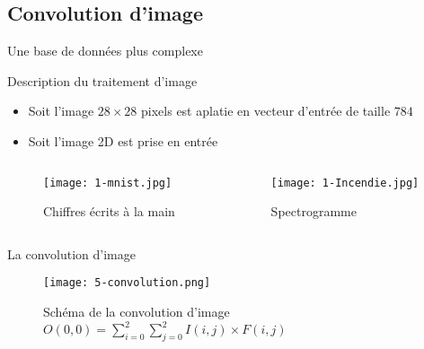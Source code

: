 \subsection{Convolution d'image}



\begin{frame}{Une base de données plus complexe}
    \begin{block}{Description du traitement d'image}
        \begin{itemize}
            \item Soit l'image $28\times28$ pixels est aplatie en vecteur d'entrée de taille $784$
            \item Soit l'image 2D est prise en entrée
        \end{itemize}
    \end{block}
    \begin{columns}
        \begin{column}{0.5\textwidth}
            \begin{figure}
                \centering
                \texttt{[image: 1-mnist.jpg]}
                \caption{Chiffres écrits à la main}
            \end{figure}
        \end{column}
        \begin{column}{0.5\textwidth}
            \begin{figure}
                \centering
                \texttt{[image: 1-Incendie.jpg]}
                \caption{Spectrogramme}
            \end{figure}
        \end{column}
    \end{columns}
\end{frame}

\begin{frame}{La convolution d'image}
    \begin{figure}
        \centering
        \texttt{[image: 5-convolution.png]}
        \centering
        \caption{Schéma de la convolution d'image $O(0, 0) = \sum_{i=0}^{2}\sum_{j=0}^{2}I(i, j)\times F(i, j)$}
    \end{figure}
\end{frame}


